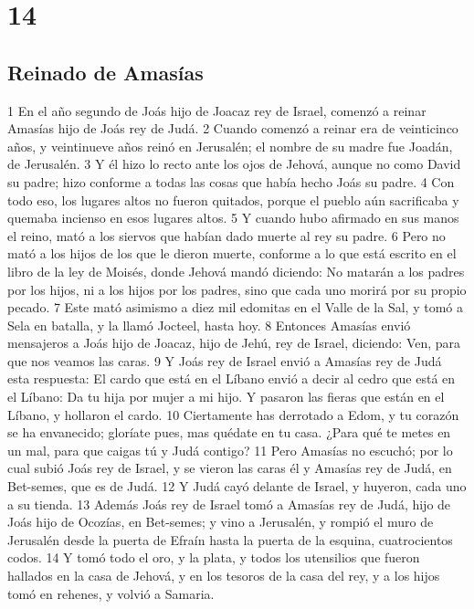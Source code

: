 \chapter{14}

\section*{Reinado de Amasías}

1 En el año segundo de Joás hijo de Joacaz rey de Israel, comenzó a reinar Amasías hijo de Joás rey de Judá.
2 Cuando comenzó a reinar era de veinticinco años, y veintinueve años reinó en Jerusalén; el nombre de su madre fue Joadán, de Jerusalén.
3 Y él hizo lo recto ante los ojos de Jehová, aunque no como David su padre; hizo conforme a todas las cosas que había hecho Joás su padre.
4 Con todo eso, los lugares altos no fueron quitados, porque el pueblo aún sacrificaba y quemaba incienso en esos lugares altos.
5 Y cuando hubo afirmado en sus manos el reino, mató a los siervos que habían dado muerte al rey su padre.
6 Pero no mató a los hijos de los que le dieron muerte, conforme a lo que está escrito en el libro de la ley de Moisés, donde Jehová mandó diciendo: No matarán a los padres por los hijos, ni a los hijos por los padres, sino que cada uno morirá por su propio pecado. 
7 Este mató asimismo a diez mil edomitas en el Valle de la Sal, y tomó a Sela en batalla, y la llamó Jocteel, hasta hoy.
8 Entonces Amasías envió mensajeros a Joás hijo de Joacaz, hijo de Jehú, rey de Israel, diciendo: Ven, para que nos veamos las caras.
9 Y Joás rey de Israel envió a Amasías rey de Judá esta respuesta: El cardo que está en el Líbano envió a decir al cedro que está en el Líbano: Da tu hija por mujer a mi hijo. Y pasaron las fieras que están en el Líbano, y hollaron el cardo.
10 Ciertamente has derrotado a Edom, y tu corazón se ha envanecido; gloríate pues, mas quédate en tu casa. ¿Para qué te metes en un mal, para que caigas tú y Judá contigo?
11 Pero Amasías no escuchó; por lo cual subió Joás rey de Israel, y se vieron las caras él y Amasías rey de Judá, en Bet-semes, que es de Judá.
12 Y Judá cayó delante de Israel, y huyeron, cada uno a su tienda.
13 Además Joás rey de Israel tomó a Amasías rey de Judá, hijo de Joás hijo de Ocozías, en Bet-semes; y vino a Jerusalén, y rompió el muro de Jerusalén desde la puerta de Efraín hasta la puerta de la esquina, cuatrocientos codos.
14 Y tomó todo el oro, y la plata, y todos los utensilios que fueron hallados en la casa de Jehová, y en los tesoros de la casa del rey, y a los hijos tomó en rehenes, y volvió a Samaria.
